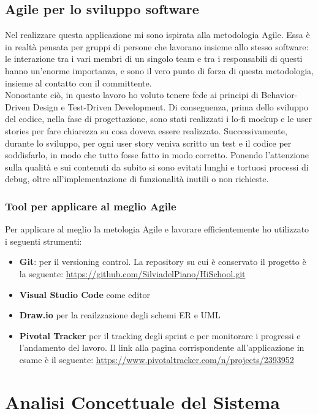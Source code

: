 \documentclass[Lau, binding=0.6cm, oneside]{sapthesis}
\begin{document}
\section{Agile per lo sviluppo software}

Nel realizzare questa applicazione mi sono ispirata alla metodologia Agile. Essa è in realtà pensata per gruppi di persone che lavorano insieme allo stesso software: le interazione tra i vari membri di un singolo team e tra i responsabili di questi hanno un'enorme importanza, e sono il vero punto di forza di questa metodologia, insieme al contatto con il committente.\\
Nonostante ciò, in questo lavoro ho voluto tenere fede ai principi di Behavior-Driven Design e Test-Driven Development. Di conseguenza, prima dello sviluppo del codice, nella fase di progettazione, sono stati realizzati i lo-fi mockup e le user stories per fare chiarezza su cosa doveva essere realizzato. Successivamente, durante lo sviluppo, per ogni user story veniva scritto un test e il codice per soddisfarlo, in modo che tutto fosse fatto in modo corretto. Ponendo l'attenzione sulla qualità e sui contenuti da subito si sono evitati lunghi e tortuosi processi di debug, oltre all'implementazione di funzionalità inutili o non richieste.

\subsection{Tool per applicare al meglio Agile}

Per applicare al meglio la metologia Agile e lavorare efficientemente ho utilizzato i seguenti strumenti:

\begin{itemize}
	\item \textbf{Git}: per il versioning control. La repository su cui è conservato il progetto è la seguente: \url{https://github.com/SilviadelPiano/HiSchool.git}
	\item \textbf{Visual Studio Code} come editor
	\item \textbf{Draw.io} per la reailzzazione degli schemi ER e UML
	\item \textbf{Pivotal Tracker} per il tracking degli sprint e per monitorare i progressi e l'andamento del lavoro. Il link alla pagina corrispondente all'applicazione in esame è il seguente: \url{https://www.pivotaltracker.com/n/projects/2393952}
\end{itemize}

\chapter{Analisi Concettuale del Sistema}
\end{document}
